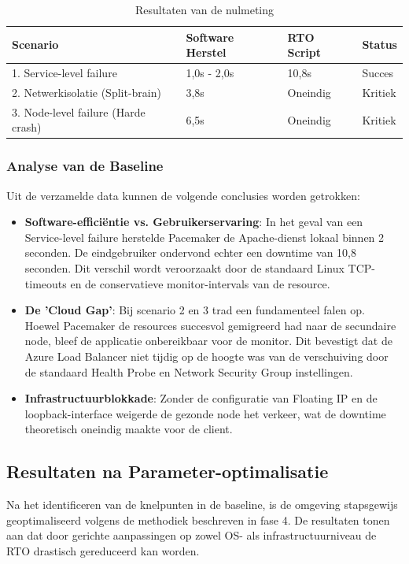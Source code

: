 \begin{table}[H]
    \centering
    \begin{tabular}{|l|l|l|l|}
        \hline
        \textbf{Scenario} & \textbf{Software Herstel} & \textbf{RTO Script} & \textbf{Status} \\ \hline
        1. Service-level failure & 1,0s - 2,0s & 10,8s & Succes \\ \hline
        2. Netwerkisolatie (Split-brain) & 3,8s & Oneindig & Kritiek \\ \hline
        3. Node-level failure (Harde crash) & 6,5s & Oneindig & Kritiek \\ \hline
    \end{tabular}
    \caption{Resultaten van de nulmeting}
\end{table}

\subsubsection{Analyse van de Baseline}
Uit de verzamelde data kunnen de volgende conclusies worden getrokken:

\begin{itemize}
    \item \textbf{Software-efficiëntie vs. Gebruikerservaring}: In het geval van een Service-level failure herstelde Pacemaker de Apache-dienst lokaal binnen 2 seconden. De eindgebruiker ondervond echter een downtime van 10,8 seconden. Dit verschil wordt veroorzaakt door de standaard Linux TCP-timeouts en de conservatieve monitor-intervals van de resource.
    \item \textbf{De 'Cloud Gap'}: Bij scenario 2 en 3 trad een fundamenteel falen op. Hoewel Pacemaker de resources succesvol gemigreerd had naar de secundaire node, bleef de applicatie onbereikbaar voor de monitor. Dit bevestigt dat de Azure Load Balancer niet tijdig op de hoogte was van de verschuiving door de standaard Health Probe en Network Security Group instellingen.
    \item \textbf{Infrastructuurblokkade}: Zonder de configuratie van Floating IP en de loopback-interface weigerde de gezonde node het verkeer, wat de downtime theoretisch oneindig maakte voor de client.
\end{itemize}

\subsection{Resultaten na Parameter-optimalisatie}
Na het identificeren van de knelpunten in de baseline, is de omgeving stapsgewijs geoptimaliseerd volgens de methodiek beschreven in fase 4. De resultaten tonen aan dat door gerichte aanpassingen op zowel OS- als infrastructuurniveau de RTO drastisch gereduceerd kan worden.


